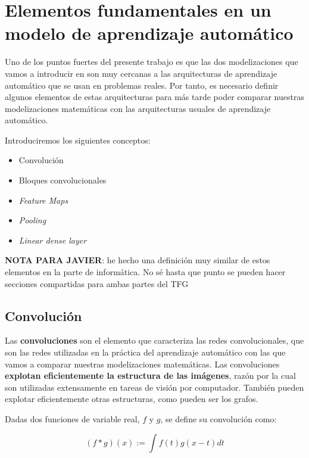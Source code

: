 \section{Elementos fundamentales en un modelo de aprendizaje automático} \label{sec:piezas_machine_learning_matematicas}

Uno de los puntos fuertes del presente trabajo es que las dos modelizaciones que vamos a introducir en  son muy cercanas a las arquitecturas de aprendizaje automático que se usan en problemas reales. Por tanto, es necesario definir algunos elementos de estas arquitecturas para más tarde poder comparar nuestras modelizaciones matemáticas con las arquitecturas usuales de aprendizaje automático.

Introduciremos los siguientes conceptos:

\begin{itemize}
    \item Convolución
    \item Bloques convolucionales
    \item \textit{Feature Maps}
    \item \textit{Pooling}
    \item \textit{Linear dense layer}
\end{itemize}

\textbf{NOTA PARA JAVIER}: he hecho una definición muy similar de estos elementos en la parte de informática. No sé hasta que punto se pueden hacer secciones compartidas para ambas partes del TFG

\subsection{Convolución}

Las \textbf{convoluciones} son el elemento que caracteriza las redes convolucionales, que son las redes utilizadas en la práctica del aprendizaje automático con las que vamos a comparar nuestras modelizaciones matemáticas. Las convoluciones \textbf{explotan eficientemente la estructura de las imágenes}, razón por la cual son utilizadas extensamente en tareas de visión por computador. También pueden explotar eficientemente otras estructuras, como pueden ser los grafos.

Dadas dos funciones de variable real, $f$ y $g$, se define su convolución como:

\begin{equation}
    (f * g)(x) := \int f(t) g(x - t) dt
\end{equation}

